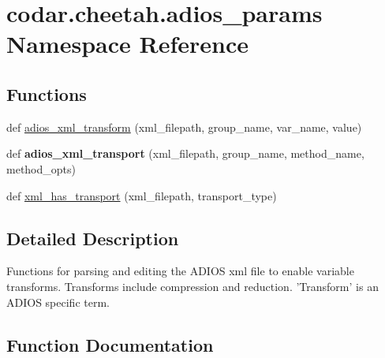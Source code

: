 \hypertarget{namespacecodar_1_1cheetah_1_1adios__params}{}\section{codar.\+cheetah.\+adios\+\_\+params Namespace Reference}
\label{namespacecodar_1_1cheetah_1_1adios__params}
\subsection*{Functions}
\begin{DoxyCompactItemize}
\item 
def \hyperlink{namespacecodar_1_1cheetah_1_1adios__params_af6d6387529764fc1a3d89a2b2709899d}{adios\+\_\+xml\+\_\+transform} (xml\+\_\+filepath, group\+\_\+name, var\+\_\+name, value)
\item 
\mbox{\label{namespacecodar_1_1cheetah_1_1adios__params_a864ce8fd49004c56565ebcc18c26f2a7}} 
def {\bfseries adios\+\_\+xml\+\_\+transport} (xml\+\_\+filepath, group\+\_\+name, method\+\_\+name, method\+\_\+opts)
\item 
def \hyperlink{namespacecodar_1_1cheetah_1_1adios__params_a9dff010d44b62d23336c76d11ed2c7e3}{xml\+\_\+has\+\_\+transport} (xml\+\_\+filepath, transport\+\_\+type)
\end{DoxyCompactItemize}


\subsection{Detailed Description}
\begin{DoxyVerb}Functions for parsing and editing the ADIOS xml file to enable variable
transforms.  Transforms include compression and reduction. 'Transform'
is an ADIOS specific term.
\end{DoxyVerb}
 

\subsection{Function Documentation}
\mbox{\label{namespacecodar_1_1cheetah_1_1adios__params_af6d6387529764fc1a3d89a2b2709899d}} 
